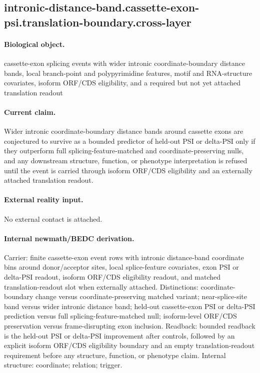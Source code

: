 \subsection{intronic-distance-band.cassette-exon-psi.translation-boundary.cross-layer}

\paragraph{Biological object.} cassette-exon splicing events with wider intronic coordinate-boundary distance bands, local branch-point and polypyrimidine features, motif and RNA-structure covariates, isoform ORF/CDS eligibility, and a required but not yet attached translation readout

\paragraph{Current claim.} Wider intronic coordinate-boundary distance bands around cassette exons are conjectured to survive as a bounded predictor of held-out PSI or delta-PSI only if they outperform full splicing-feature-matched and coordinate-preserving nulls, and any downstream structure, function, or phenotype interpretation is refused until the event is carried through isoform ORF/CDS eligibility and an externally attached translation readout.

\paragraph{External reality input.}
No external contact is attached.

\paragraph{Internal newmath/BEDC derivation.} Carrier: finite cassette-exon event rows with intronic distance-band coordinate bins around donor/acceptor sites, local splice-feature covariates, exon PSI or delta-PSI readout, isoform ORF/CDS eligibility readout, and matched translation-readout slot when externally attached. Distinctions: coordinate-boundary change versus coordinate-preserving matched variant; near-splice-site band versus wider intronic distance band; held-out cassette-exon PSI or delta-PSI prediction versus full splicing-feature-matched null; isoform-level ORF/CDS preservation versus frame-disrupting exon inclusion. Readback: bounded readback is the held-out PSI or delta-PSI improvement after controls, followed by an explicit isoform ORF/CDS eligibility boundary and an empty translation-readout requirement before any structure, function, or phenotype claim. Internal structure: coordinate; relation; trigger.

